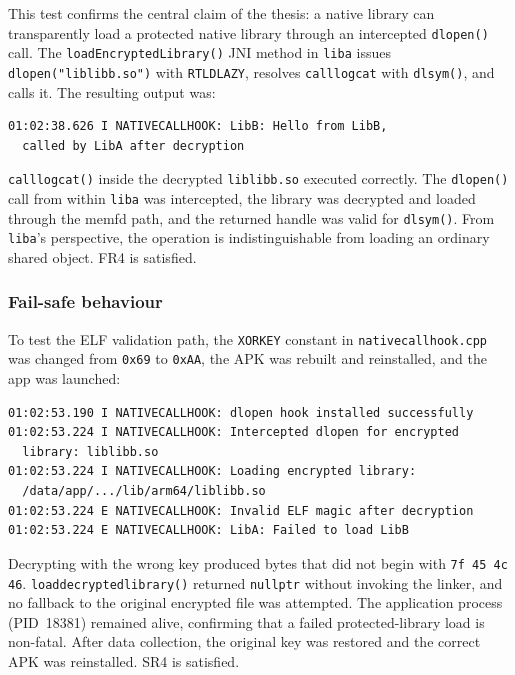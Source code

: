 \documentclass[11pt,a4paper]{report}
\renewcommand\_{{\textunderscore\allowbreak}}
\begin{document}
This test confirms the central claim of the thesis: a native library can transparently load a protected native library through an intercepted \texttt{dlopen()} call. The \texttt{loadEncryptedLibrary()} JNI method in \texttt{liba} issues \texttt{dlopen("liblibb.so")} with \texttt{RTLD\_LAZY}, resolves \texttt{call\_logcat} with \texttt{dlsym()}, and calls it. The resulting output was:

\begin{verbatim}
01:02:38.626 I NATIVECALLHOOK: LibB: Hello from LibB,
  called by LibA after decryption
\end{verbatim}

\texttt{call\_logcat()} inside the decrypted \texttt{liblibb.so} executed correctly. The \texttt{dlopen()} call from within \texttt{liba} was intercepted, the library was decrypted and loaded through the memfd path, and the returned handle was valid for \texttt{dlsym()}. From \texttt{liba}'s perspective, the operation is indistinguishable from loading an ordinary shared object. FR4 is satisfied.

\subsubsection{Fail-safe behaviour}

To test the ELF validation path, the \texttt{XOR\_KEY} constant in \texttt{nativecallhook.cpp} was changed from \texttt{0x69} to \texttt{0xAA}, the APK was rebuilt and reinstalled, and the app was launched:

\begin{verbatim}
01:02:53.190 I NATIVECALLHOOK: dlopen hook installed successfully
01:02:53.224 I NATIVECALLHOOK: Intercepted dlopen for encrypted
  library: liblibb.so
01:02:53.224 I NATIVECALLHOOK: Loading encrypted library:
  /data/app/.../lib/arm64/liblibb.so
01:02:53.224 E NATIVECALLHOOK: Invalid ELF magic after decryption
01:02:53.224 E NATIVECALLHOOK: LibA: Failed to load LibB
\end{verbatim}

Decrypting with the wrong key produced bytes that did not begin with \texttt{7f 45 4c 46}. \texttt{load\_decrypted\_\allowbreak library()} returned \texttt{nullptr} without invoking the linker, and no fallback to the original encrypted file was attempted. The application process (PID~18381) remained alive, confirming that a failed protected-library load is non-fatal. After data collection, the original key was restored and the correct APK was reinstalled. SR4 is satisfied.
\end{document}

